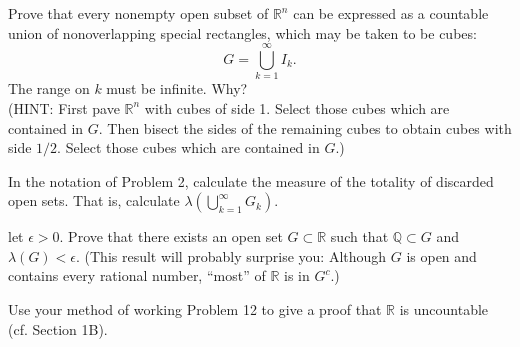 \documentclass[answers]{exam}
\begin{document}
\begin{questions}
\begin{solution}
   \end{solution}

   \question
   Prove that every nonempty open subset of $\mathbb{R}^{n}$ can be expressed as a countable union of nonoverlapping special rectangles, which may be taken to be cubes:
   $$
      G = \bigcup_{k=1}^{\infty}I_{k}.
   $$
   The range on $k$ must be infinite. Why?\\
   (HINT: First pave $\mathbb{R}^{n}$ with cubes of side 1. Select those cubes which are contained in $G$. Then bisect the sides of the remaining cubes to obtain cubes with side $1/2$. Select those cubes which are contained in $G$.)
   \begin{solution}

   \end{solution}
   \question
      In the notation of Problem 2, calculate the measure of the totality of discarded open sets. That is, calculate $\lambda \left(\bigcup_{k=1}^{\infty} G_{k} \right)$.
   \begin{solution}

   \end{solution}
   \question
   let $\epsilon > 0$. Prove that there exists an open set $G \subset \mathbb{R}$ such that $\mathbb{Q} \subset G$ and $\lambda\left(G\right) < \epsilon$. (This result will probably surprise you: Although $G$ is open and contains every rational number, ``most'' of $\mathbb{R}$ is in $G^{c}$.)
   \begin{solution}

   \end{solution}
   \question
   Use your method of working Problem 12 to give a proof that $\mathbb{R}$ is uncountable (cf. Section 1B).
   \begin{solution}

   \end{solution}
\end{questions}
\end{document}
